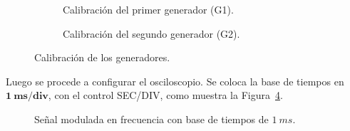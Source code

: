       \begin{figure}[H]
        \centering
        \begin{subfigure}[H]{0.48\textwidth}
          \caption{Calibración del primer generador (G1).}
          \label{fig:Exp6CalibracionG1}
        \end{subfigure}
        \hfill 
        \begin{subfigure}[H]{0.48\textwidth}
          \caption{Calibración del segundo generador (G2).}
          \label{fig:Exp6CalibracionG2}
        \end{subfigure}

        \caption{Calibración de los generadores.}
        \label{fig:Exp6CalibracionGeneradores}
      \end{figure}

    Luego se procede a configurar el osciloscopio. Se coloca la base de tiempos  
    en $\mathbf{1~ms/div}$, con el control SEC/DIV, como muestra la Figura~\ref{fig:Exp6SeñalFM1ms}.

      \begin{figure}[H]
        \centering
          \caption{Señal modulada en frecuencia con base de tiempos de $1~ms$.}
          \label{fig:Exp6SeñalFM1ms}
      \end{figure}

